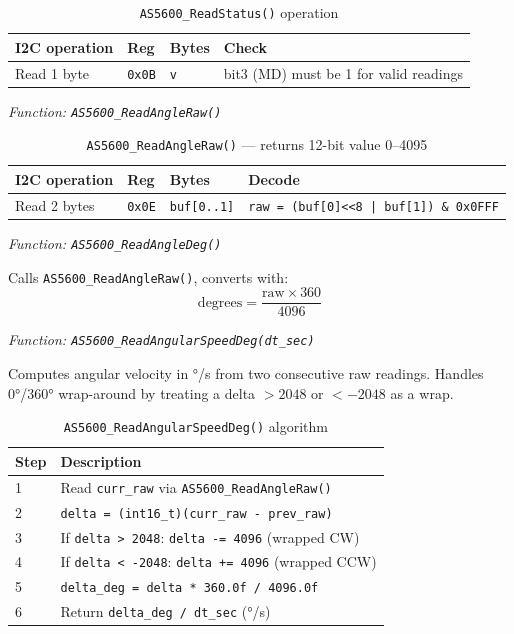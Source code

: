 \documentclass[12pt,a4paper]{article}
\begin{document}
\begin{table}[H]
\centering
\begin{tabular}{llll}
\hline
\textbf{I2C operation} & \textbf{Reg} & \textbf{Bytes} & \textbf{Check} \\
\hline
Read 1 byte & \texttt{0x0B} & \texttt{v} & bit3 (MD) must be 1 for valid readings \\
\hline
\end{tabular}
\caption{\texttt{AS5600\_ReadStatus()} operation}
\end{table}

\textit{Function: \texttt{AS5600\_ReadAngleRaw()}}

\begin{table}[H]
\centering
\begin{tabular}{llll}
\hline
\textbf{I2C operation} & \textbf{Reg} & \textbf{Bytes} & \textbf{Decode} \\
\hline
Read 2 bytes & \texttt{0x0E} & \texttt{buf[0..1]} & \texttt{raw = (buf[0]<<8 | buf[1]) \& 0x0FFF} \\
\hline
\end{tabular}
\caption{\texttt{AS5600\_ReadAngleRaw()} — returns 12-bit value 0--4095}
\end{table}

\textit{Function: \texttt{AS5600\_ReadAngleDeg()}}

Calls \texttt{AS5600\_ReadAngleRaw()}, converts with:
\[
\text{degrees} = \frac{\text{raw} \times 360}{4096}
\]

\textit{Function: \texttt{AS5600\_ReadAngularSpeedDeg(dt\_sec)}}

Computes angular velocity in °/s from two consecutive raw readings.
Handles 0°/360° wrap-around by treating a delta $>2048$ or $<-2048$ as a wrap.

\begin{table}[H]
\centering
\begin{tabular}{lp{9cm}}
\hline
\textbf{Step} & \textbf{Description} \\
\hline
1 & Read \texttt{curr\_raw} via \texttt{AS5600\_ReadAngleRaw()} \\
2 & \texttt{delta = (int16\_t)(curr\_raw - prev\_raw)} \\
3 & If \texttt{delta > 2048}: \texttt{delta -= 4096} (wrapped CW) \\
4 & If \texttt{delta < -2048}: \texttt{delta += 4096} (wrapped CCW) \\
5 & \texttt{delta\_deg = delta * 360.0f / 4096.0f} \\
6 & Return \texttt{delta\_deg / dt\_sec} (°/s) \\
\hline
\end{tabular}
\caption{\texttt{AS5600\_ReadAngularSpeedDeg()} algorithm}
\end{table}
\end{document}
